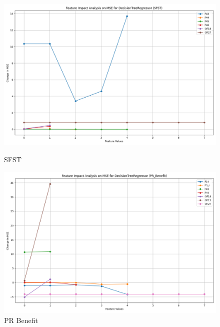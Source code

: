 \begin{figure}[H]
    \centering
    \begin{minipage}{0.495\textwidth}
        \centering
        \includegraphics[width=\linewidth]{analysis/images_reg/feature_impact_mse_SFST_DecisionTreeRegressor.png}
        \caption{SFST}
        \label{fig:sfst_mse_analysis}
    \end{minipage}\hfill
    \begin{minipage}{0.495\textwidth}
        \centering
        \includegraphics[width=\linewidth]{analysis/images_reg/feature_impact_mse_PR_Benefit_DecisionTreeRegressor.png}
        \caption{PR Benefit}
        \label{fig:pr_ben_mse_analysis}
    \end{minipage}
\end{figure}

